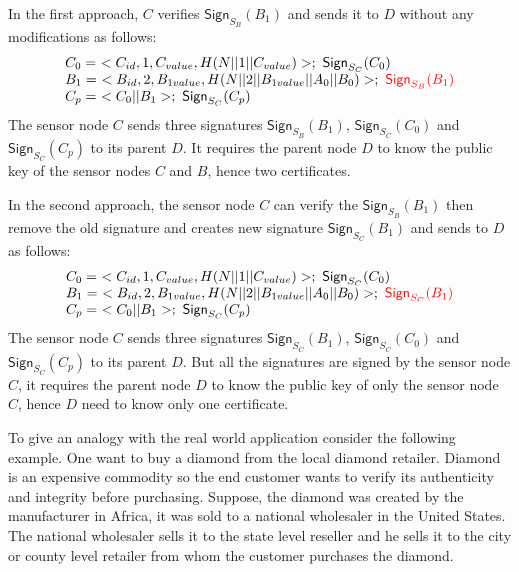 	In the first approach, $C$ verifies $\textsf{Sign}_{S_{B}}(B_{1})$ and sends it to $D$ without any modifications as follows:
	\begin{equation}	
		\begin{array}{l}
			C_{0} =\ <C_{id}, 1, C_{value}, H(N||1||C_{value})>;\ \textsf{Sign}_{S_{C}}(C_{0})\\
			B_{1} =\ <B_{id}, 2, B_{1value}, H(N||2||B_{1value}||A_{0}||B_{0})>;\  \textcolor{red}{\textsf{Sign}_{S_{B}}(B_{1})}\\
			C_{p} =\ <C_{0}||B_{1}>;\ \textsf{Sign}_{S_{C}}(C_{p})
		\end{array}
		\label{eq:forwarding-payload-without-resigning}
	\end{equation}
	The sensor node $C$ sends three signatures $\textsf{Sign}_{S_{B}}(B_{1})$, $\textsf{Sign}_{S_{C}}(C_{0}) $ and $\textsf{Sign}_{S_{C}}(C_{p})$ to its parent $D$.
	It requires the parent node $D$ to know the public key of the sensor nodes $C$ and $B$, hence two certificates.

	In the second approach, the sensor node $C$ can verify the $\textsf{Sign}_{S_{B}}(B_{1})$ then remove the old signature and creates new signature $\textsf{Sign}_{S_{C}}(B_{1})$ and sends to $D$ as follows:
	\begin{equation}	
		\begin{array}{l}
			C_{0} =\ <C_{id}, 1, C_{value}, H(N||1||C_{value})>;\ \textsf{Sign}_{S_{C}}(C_{0})\\
			B_{1} =\ <B_{id}, 2, B_{1value}, H(N||2||B_{1value}||A_{0}||B_{0})>;\  \textcolor{red}{\textsf{Sign}_{S_{C}}(B_{1})}\\
			C_{p} =\ <C_{0}||B_{1}>;\ \textsf{Sign}_{S_{C}}(C_{p})
		\end{array}
		\label{eq:forwarding-payload-with-resigning}
	\end{equation}
	The sensor node $C$ sends three signatures $\textsf{Sign}_{S_{C}}(B_{1})$, $\textsf{Sign}_{S_{C}}(C_{0}) $ and $\textsf{Sign}_{S_{C}}(C_{p})$ to its parent $D$.
	But all the signatures are signed by the sensor node $C$, it requires the parent node $D$ to know the public key of only the sensor node $C$, hence $D$ need to know only one certificate.

	To give an analogy with the real world application consider the following example.
	One want to buy a diamond from the local diamond retailer.
	Diamond is an expensive commodity so the end customer wants to verify its authenticity and integrity before purchasing.
	Suppose, the diamond was created by the manufacturer in Africa, it was sold to a national wholesaler in the United States. 
	The national wholesaler sells it to the state level reseller and he sells it to the city or county level retailer from whom the customer purchases the diamond.

